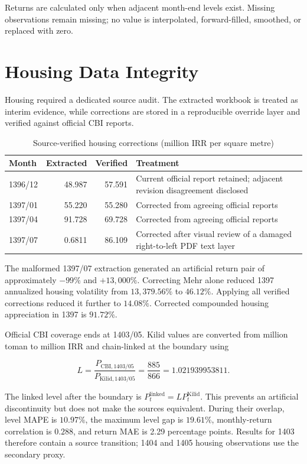 \documentclass[11pt,a4paper]{article}
\begin{document}
Returns are calculated only when adjacent month-end levels exist. Missing observations remain
missing; no value is interpolated, forward-filled, smoothed, or replaced with zero.

\section{Housing Data Integrity}

Housing required a dedicated source audit. The extracted workbook is treated as interim evidence,
while corrections are stored in a reproducible override layer and verified against official CBI
reports.

\begin{table}[ht]
\centering
\caption{Source-verified housing corrections (million IRR per square metre)}
\begin{tabular}{lrrp{7.2cm}}
\toprule
Month & Extracted & Verified & Treatment \\
\midrule
1396/12 & 48.987 & 57.591 & Current official report retained; adjacent revision disagreement disclosed \\
1397/01 & 55.220 & 55.280 & Corrected from agreeing official reports \\
1397/04 & 91.728 & 69.728 & Corrected from agreeing official reports \\
1397/07 & 0.6811 & 86.109 & Corrected after visual review of a damaged right-to-left PDF text layer \\
\bottomrule
\end{tabular}
\end{table}

The malformed 1397/07 extraction generated an artificial return pair of approximately
$-99\%$ and $+13{,}000\%$. Correcting Mehr alone reduced 1397 annualized housing volatility
from $13{,}379.56\%$ to $46.12\%$. Applying all verified corrections reduced it further to
$14.08\%$. Corrected compounded housing appreciation in 1397 is $91.72\%$.

Official CBI coverage ends at 1403/05. Kilid values are converted from million toman to million
IRR and chain-linked at the boundary using

\begin{equation}
L=\frac{P_{\text{CBI},1403/05}}{P_{\text{Kilid},1403/05}}
=\frac{885}{866}=1.021939953811.
\end{equation}

The linked level after the boundary is $P_t^{\text{linked}}=L P_t^{\text{Kilid}}$. This prevents
an artificial discontinuity but does not make the sources equivalent. During their overlap,
level MAPE is $10.97\%$, the maximum level gap is $19.61\%$, monthly-return correlation is
$0.288$, and return MAE is 2.29 percentage points. Results for 1403 therefore contain a source
transition; 1404 and 1405 housing observations use the secondary proxy.
\end{document}
